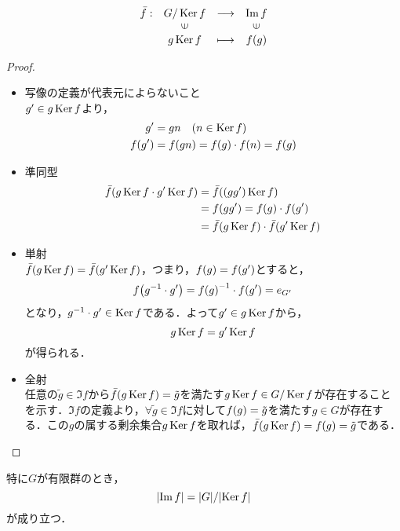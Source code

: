 \documentclass[main]{subfiles}
\begin{document}
	\begin{align*}
		\begin{array}{rccc}
			\bar{f}: & G/\Ker f              & \longrightarrow & \Im f                 \\
			         & \rotatebox{90}{$\in$} &                 & \rotatebox{90}{$\in$} \\
			         & g\Ker f               & \longmapsto     & f\qty(g)
		\end{array}
	\end{align*}
	\begin{proof}
		\begin{itemize}
			\item 写像の定義が代表元によらないこと\\$g^\prime\in g\operatorname{Ker} f$より，
				\begin{align*}
					g^\prime        & =gn\quad\qty(n\in\operatorname{Ker} f)                   \\
					f\qty(g^\prime) & =f\qty(gn)=f\qty(g)\cdot f\qty(n)=f\qty(g)
				\end{align*}
			\item 準同型
				\begin{align*}
					\bar{f}\qty(g\operatorname{Ker} f\cdot g^\prime\operatorname{Ker} f) & =\bar{f}\qty(\qty(gg^\prime)\operatorname{Ker} f)                   \\
					                                         & =f\qty(gg^\prime)=f\qty(g)\cdot f\qty(g^\prime)       \\
					                                         & =\bar{f}\qty(g\operatorname{Ker} f)\cdot\bar{f}\qty(g^\prime\operatorname{Ker} f)
				\end{align*}
			\item 単射\\$\bar{f}\qty(g\operatorname{Ker} f)=\bar{f}\qty(g^\prime\operatorname{Ker} f)$，つまり，$f\qty(g)=f\qty(g^\prime)$とすると，
					\[f\qty(g^{-1}\cdot g^\prime)=f\qty(g)^{-1}\cdot f\qty(g^\prime)=e_{G^\prime}\]
					となり，$g^{-1}\cdot g^\prime\in\operatorname{Ker} f$である．よって$g^\prime\in g\operatorname{Ker} f$から，
				\[g\operatorname{Ker} f=g^\prime\operatorname{Ker} f\]
				が得られる．
			\item 全射\\任意の$\tilde{g}\in\Im f$から$\bar{f}\qty(g\operatorname{Ker} f)=\tilde{g}$を満たす$g\operatorname{Ker} f\in G/\operatorname{Ker} f$が存在することを示す．$\Im f$の定義より，$\forall\tilde{g}\in\Im f$に対して$f\qty(g)=\tilde{g}$を満たす$g\in G$が存在する．この$g$の属する剰余集合$g\operatorname{Ker} f$を取れば，$\bar{f}\qty(g\operatorname{Ker} f)=f\qty(g)=\tilde{g}$である．
		\end{itemize}
	\end{proof}
	\begin{cor}
		特に$G$が有限群のとき，
		\[\qty|\Im f|=\qty|G|/\qty|\operatorname{Ker} f|\]
		が成り立つ．
	\end{cor}
\end{document}
